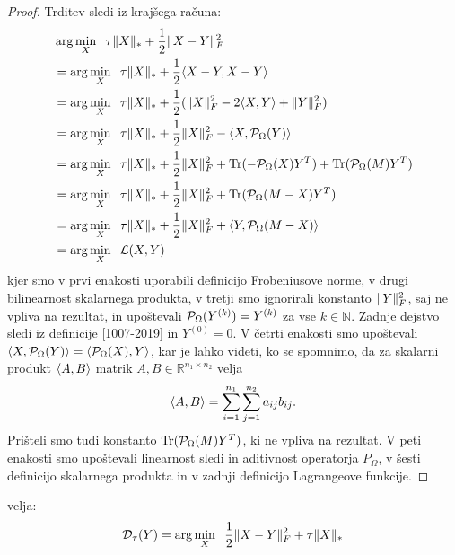 \begin{proof}
Trditev sledi iz krajšega računa:
\begin{align*}
    &\arg \min_X \hspace{0.2cm} \tau\lVert X\rVert_* + \frac{1}{2}\lVert X - Y\rVert_F^2 \\
    &=\arg \min_X \hspace{0.2cm} \tau\lVert X\rVert_* + \frac{1}{2}\langle X - Y, X - Y \rangle\\
    &=\arg \min_X \hspace{0.2cm} \tau\lVert X\rVert_* + \frac{1}{2}(\lVert X\rVert_F^2 - 2\langle X, Y \rangle + \lVert Y\rVert_F^2) \\ 
    &=\arg \min_X \hspace{0.2cm} \tau\lVert X\rVert_* + \frac{1}{2}\lVert X\rVert_F^2 - \langle X, \mathcal{P}_\Omega(Y) \rangle\\
    &=\arg \min_X \hspace{0.2cm} \tau\lVert X\rVert_* + \frac{1}{2}\lVert X\rVert_F^2 + \operatorname{Tr}(- \mathcal{P}_\Omega(X)Y^T) + \operatorname{Tr}(\mathcal{P}_\Omega(M)Y^T)\\
    &=\arg \min_X \hspace{0.2cm} \tau\lVert X\rVert_* + \frac{1}{2}\lVert X\rVert_F^2 + \operatorname{Tr}(\mathcal{P}_\Omega(M - X)Y^T)\\
    &=\arg \min_X \hspace{0.2cm} \tau\lVert X\rVert_* + \frac{1}{2}\lVert X\rVert_F^2 + \langle Y, \mathcal{P}_\Omega(M - X) \rangle\\ 
    &= \arg \min_X \hspace{0.2cm} \mathcal{L}(X, Y)
\end{align*}
kjer smo v prvi enakosti uporabili definicijo Frobeniusove norme, v drugi bilinearnost skalarnega produkta, 
v tretji smo ignorirali konstanto $\lVert Y\rVert_F^2$, saj ne vpliva na rezultat, 
in upoštevali $\mathcal{P}_\Omega(Y^{(k)}) = Y^{(k)}$ za vse $k \in \mathbb{N}$. Zadnje dejstvo sledi iz definicije \eqref{1007-2019} in $Y^{(0)} = 0$. V četrti enakosti smo upoštevali $\langle X, \mathcal{P}_\Omega(Y) \rangle = \langle \mathcal{P}_\Omega(X), Y \rangle$, kar je lahko videti, ko se spomnimo, da za skalarni produkt $\langle A, B \rangle$ matrik $A, B \in \mathbb{R}^{n_1 \times n_2}$ velja 
\[
    \langle A, B \rangle = \sum_{i = 1}^{n_1}\sum_{j = 1}^{n_2} a_{ij}b_{ij}.
\]
Prišteli smo tudi konstanto $\operatorname{Tr}(\mathcal{P}_\Omega(M)Y^T)$, ki ne vpliva na rezultat.
V peti enakosti smo upoštevali linearnost sledi in aditivnost operatorja $P_\Omega$,
v šesti definicijo skalarnega produkta in v zadnji definicijo Lagrangeove funkcije.
\end{proof}
\begin{theorem} \label{1907-2240}
 velja:
\begin{align}
    \label{2906-1056}
    \mathcal{D}_\tau(Y) = \arg \min_{X} \hspace{0.2cm}\frac{1}{2} \lVert X-Y\rVert_F^2 + \tau\lVert X\rVert_* 
\end{align}
\end{theorem}

